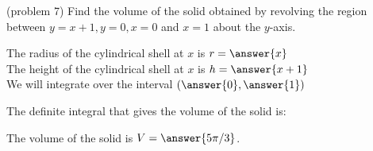 \documentclass{ximera}
\begin{document}
\begin{problem}(problem 7)
Find the volume of the solid obtained by revolving the region between $y= x+1, y = 0, x = 0$ and $x = 1$ about the $y$-axis.


The radius of the cylindrical shell at $x$ is $r = \answer{x}$\\
The height of the cylindrical shell at $x$ is $h = \answer{x+1}$\\

We will integrate over the interval $\left(\answer{0},\answer{1}\right)$

The definite integral that gives the volume of the solid is:\\
\begin{multipleChoice}
\end{multipleChoice}

The volume of the solid is $V = \answer{5\pi/3 }$.

\end{problem}
\end{document}
